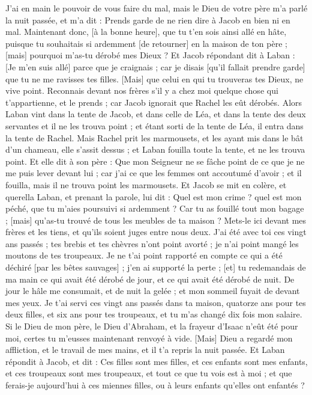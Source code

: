 \begin{multicols}{2}
J'ai en main le pouvoir de vous faire du mal, mais le Dieu de votre père m'a parlé la nuit passée, et m'a dit : Prends garde de ne rien dire à Jacob en bien ni en mal.
Maintenant donc, [à la bonne heure], que tu t'en sois ainsi allé en hâte, puisque tu souhaitais si ardemment [de retourner] en la maison de ton père ; [mais] pourquoi m'as-tu dérobé mes Dieux ?
Et Jacob répondant dit à Laban : [Je m'en suis allé] parce que je craignais ; car je disais [qu'il fallait prendre garde] que tu ne me ravisses tes filles.
[Mais] que celui en qui tu trouveras tes Dieux, ne vive point. Reconnais devant nos frères s'il y a chez moi quelque chose qui t'appartienne, et le prends ; car Jacob ignorait que Rachel les eût dérobés.
Alors Laban vint dans la tente de Jacob, et dans celle de Léa, et dans la tente des deux servantes et il ne les trouva point ; et étant sorti de la tente de Léa, il entra dans la tente de Rachel.
Mais Rachel prit les marmousets, et les ayant mis dans le bât d'un chameau, elle s'assit dessus ; et Laban fouilla toute la tente, et ne les trouva point.
Et elle dit à son père : Que mon Seigneur ne se fâche point de ce que je ne me puis lever devant lui ; car j'ai ce que les femmes ont accoutumé d'avoir ; et il fouilla, mais il ne trouva point les marmousets.
Et Jacob se mit en colère, et querella Laban, et prenant la parole, lui dit : Quel est mon crime ? quel est mon péché, que tu m'aies poursuivi si ardemment ?
Car tu as fouillé tout mon bagage ; [mais] qu'as-tu trouvé de tous les meubles de ta maison ? Mets-le ici devant mes frères et les tiens, et qu'ils soient juges entre nous deux.
J'ai été avec toi ces vingt ans passés ; tes brebis et tes chèvres n'ont point avorté ; je n'ai point mangé les moutons de tes troupeaux.
Je ne t'ai point rapporté en compte ce qui a été déchiré [par les bêtes sauvages] ; j'en ai supporté la perte ; [et] tu redemandais de ma main ce qui avait été dérobé de jour, et ce qui avait été dérobé de nuit.
De jour le hâle me consumait, et de nuit la gelée ; et mon sommeil fuyait de devant mes yeux.
Je t'ai servi ces vingt ans passés dans ta maison, quatorze ans pour tes deux filles, et six ans pour tes troupeaux, et tu m'as changé dix fois mon salaire.
Si le Dieu de mon père, le Dieu d'Abraham, et la frayeur d'Isaac n'eût été pour moi, certes tu m'eusses maintenant renvoyé à vide. [Mais] Dieu a regardé mon affliction, et le travail de mes mains, et il t'a repris la nuit passée.
Et Laban répondit à Jacob, et dit : Ces filles sont mes filles, et ces enfants sont mes enfants, et ces troupeaux sont mes troupeaux, et tout ce que tu vois est à moi ; et que ferais-je aujourd'hui à ces miennes filles, ou à leurs enfants qu'elles ont enfantés ?

\end{multicols}
